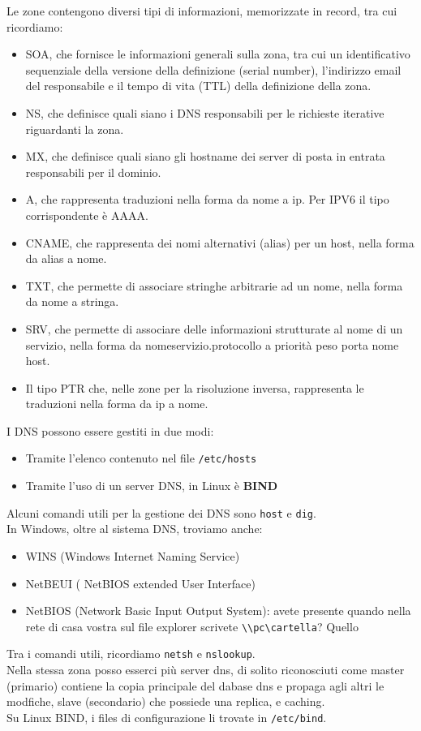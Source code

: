 \documentclass[a4paper]{report}
\begin{document}
Le zone contengono diversi tipi di informazioni, memorizzate in record, tra cui
ricordiamo:
\begin{itemize}
\item SOA, che fornisce le informazioni generali sulla zona, tra cui un identificativo sequenziale della versione
della definizione (serial number), l'indirizzo email del responsabile e il tempo di vita (TTL) della definizione
della zona.
\item NS, che definisce quali siano i DNS responsabili per le richieste iterative riguardanti la zona.
\item MX, che definisce quali siano gli hostname dei server di posta in entrata responsabili per il dominio.
\item A, che rappresenta traduzioni nella forma da nome a ip. Per IPV6 il tipo corrispondente è AAAA.
\item CNAME, che rappresenta dei nomi alternativi (alias) per un host, nella forma da alias a nome.
\item TXT, che permette di associare stringhe arbitrarie ad un nome, nella forma da nome a stringa.
\item SRV, che permette di associare delle informazioni strutturate al nome di un servizio, nella forma da nomeservizio.protocollo a priorità peso porta nome host.
\item Il tipo PTR che, nelle zone per la risoluzione inversa, rappresenta le traduzioni nella forma da ip a nome.
\end{itemize}
I DNS possono essere gestiti in due modi:
\begin{itemize}
\item Tramite l'elenco contenuto nel file \texttt{/etc/hosts}
\item Tramite l'uso di un server DNS, in Linux è \textbf{BIND}
\end{itemize}
Alcuni comandi utili per la gestione dei DNS sono \texttt{host} e \texttt{dig}.\\
In Windows, oltre al sistema DNS, troviamo anche:
\begin{itemize}
\item WINS (Windows Internet Naming Service)
\item NetBEUI ( NetBIOS extended User Interface)
\item NetBIOS (Network Basic Input Output System): avete presente
quando nella rete di casa vostra sul file explorer scrivete
\texttt{\textbackslash \textbackslash pc\textbackslash cartella}? Quello
\end{itemize}
Tra i comandi utili, ricordiamo \texttt{netsh} e \texttt{nslookup}.\\
Nella stessa zona posso esserci più server dns,
di solito riconosciuti come master (primario)
contiene la copia principale del dabase dns e
propaga agli altri le modfiche, slave (secondario)
che possiede una replica, e caching.\\
Su Linux BIND, i files di configurazione li trovate in \texttt{/etc/bind}.\\
\end{document}
